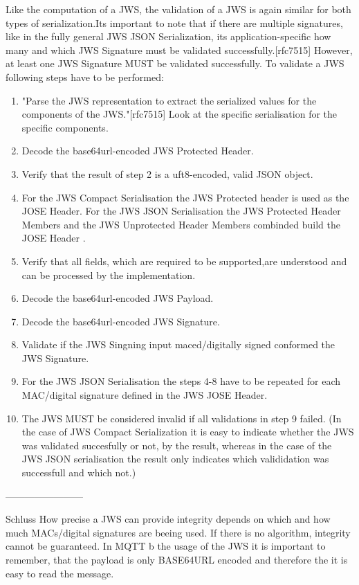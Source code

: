 Like the computation of a JWS, the validation of a JWS is again similar for both types of serialization.Its important to note that if there are multiple signatures, like in the fully general JWS JSON Serialization,  its application-specific how many and which JWS Signature must be validated successfully.[rfc7515] However, at least one JWS Signature MUST be validated successfully.
To validate a JWS following steps have to be performed:\newline  
\begin{enumerate}
\item "Parse the JWS representation to extract the serialized values for the components of the JWS."[rfc7515] Look at the specific serialisation for the specific components.
\item Decode the base64url-encoded JWS Protected Header.
\item Verify that the result of step 2 is a uft8-encoded, valid JSON object.
\item For the JWS Compact Serialisation the JWS Protected header is used as the JOSE Header. For the JWS JSON Serialisation the JWS Protected Header Members and the JWS Unprotected Header Members combinded build the JOSE Header .
\item Verify that all fields, which are required to be supported,are understood and can be processed by the implementation.

\item Decode the base64url-encoded JWS Payload.
\item Decode the base64url-encoded JWS Signature.
\item Validate if the JWS Singning input maced/digitally signed conformed the JWS Signature.
\item For the JWS JSON Serialisation the steps 4-8 have to be repeated for each MAC/digital signature defined in the JWS JOSE Header.
\item The JWS MUST be considered invalid if all validations in step 9 failed. (In the case of JWS Compact Serialization it is easy to indicate whether the JWS was validated succesfully or not, by the result, whereas in the case of the JWS JSON serialisation the result only indicates which valididation was successfull and which not.)
\end{enumerate}
------------------------

Schluss 
How precise a JWS can provide integrity depends on which and how much MACs/digital signatures are beeing used. If there is no algorithm, integrity cannot be guaranteed. In MQTT 
b the usage of the JWS it is important to remember, that the payload is only BASE64URL encoded and therefore the it is easy to read the message.